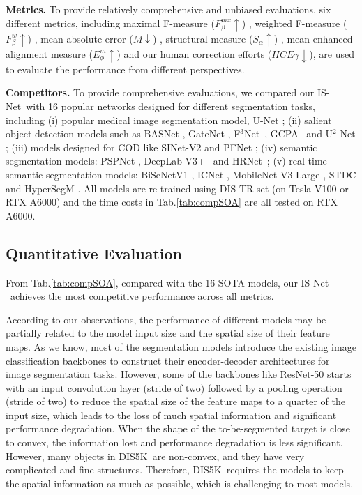 \textbf{Metrics.}
To provide relatively comprehensive and unbiased evaluations, six different metrics, including maximal F-measure ($F_\beta^{mx}\uparrow$) \cite{achanta2009frequency}, weighted F-measure ($F^w_\beta\uparrow$) \cite{Margolin2014HowTE}, mean absolute error ($M\downarrow$) \cite{perazzi2012saliency}, structural measure ($S_{\alpha}\uparrow$) \cite{fan2017structure}, mean enhanced alignment measure ($E_{\phi}^{m}\uparrow$) \cite{fan2018enhanced,fan2021cognitive} and our human correction efforts ($HCE\gamma\downarrow$), are used to evaluate the performance from different perspectives. 

\textbf{Competitors.}
To provide comprehensive evaluations, we compared our IS-Net~with 16 popular networks designed for different segmentation tasks, including (i) popular medical image segmentation model, U-Net \cite{ronneberger2015u}; (ii) salient object detection models such as BASNet \cite{qin2019basnet}, GateNet \cite{zhao2020suppress}, F$^3$Net~\cite{wei2020f3net}, GCPA~\cite{chen2020global} and U$^2$-Net \cite{qin2020u2}; (iii) models designed for COD like SINet-V2\cite{fan2021concealed} and PFNet \cite{Mei_2021_CVPR}; (iv) semantic segmentation models: PSPNet \cite{zhao2017pyramid}, DeepLab-V3+~\cite{chen2018encoder} and HRNet~\cite{WangSCJDZLMTWLX19}; (v) real-time semantic segmentation models: BiSeNetV1 \cite{yu2018bisenet}, ICNet \cite{zhao2018icnet}, MobileNet-V3-Large \cite{DBLP:conf/iccv/HowardPALSCWCTC19}, STDC \cite{fan2021rethinking} and HyperSegM \cite{nirkin2020hyperseg}. All models are re-trained using DIS-TR set (on Tesla V100 or RTX A6000) and the time costs in Tab.\ref{tab:compSOA} are all tested on RTX A6000. 

\subsection{Quantitative Evaluation}

From Tab.\ref{tab:compSOA}, compared with the 16 SOTA models, our IS-Net ~achieves the most competitive performance across all metrics. 

According to our observations, the performance of different models may be partially related to the model input size and the spatial size of their feature maps. As we know, most of the segmentation models introduce the existing image classification backbones to construct their encoder-decoder architectures for image segmentation tasks. However, some of the backbones like ResNet-50 \cite{he2016deep} starts with an input convolution layer (stride of two) followed by a pooling operation (stride of two) to reduce the spatial size of the feature maps to a quarter of the input size, which leads to the loss of much spatial information and significant performance degradation. When the shape of the to-be-segmented target is close to convex, the information lost and performance degradation is less significant. However, many objects in DIS5K~are non-convex, and they have very complicated and fine structures. Therefore, DIS5K~requires the models to keep the spatial information as much as possible, which is challenging to most models. 


